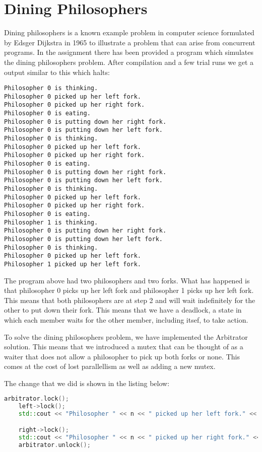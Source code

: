 \section{Dining Philosophers}

Dining philosophers is a known example problem in computer science formulated
by Edsger Dijkstra in 1965 to illustrate a problem that can arise from concurrent
programs. In the assignment there has been provided a program which simulates
the dining philosophers problem. After compilation and a few trial runs we get
a output similar to this which halts:

\begin{lstlisting}[caption=Output from the dining philosophers program.]
Philosopher 0 is thinking.
Philosopher 0 picked up her left fork.
Philosopher 0 picked up her right fork.
Philosopher 0 is eating.
Philosopher 0 is putting down her right fork.
Philosopher 0 is putting down her left fork.
Philosopher 0 is thinking.
Philosopher 0 picked up her left fork.
Philosopher 0 picked up her right fork.
Philosopher 0 is eating.
Philosopher 0 is putting down her right fork.
Philosopher 0 is putting down her left fork.
Philosopher 0 is thinking.
Philosopher 0 picked up her left fork.
Philosopher 0 picked up her right fork.
Philosopher 0 is eating.
Philosopher 1 is thinking.
Philosopher 0 is putting down her right fork.
Philosopher 0 is putting down her left fork.
Philosopher 0 is thinking.
Philosopher 0 picked up her left fork.
Philosopher 1 picked up her left fork.
\end{lstlisting}

The program above had two philosophers and two forks. What has happened is that 
philosopher 0 picks up her left fork and philosopher 1 picks up her left fork.
This means that both philosophers are at step 2 and will wait indefinitely for
the other to put down their fork. This means that we have a deadlock, a state in 
which each member waits for the other member, including itsef, to take action.

To solve the dining philosophers problem, we have implemented the Arbitrator 
solution. This means that we introduced a mutex that can be thought of as a 
waiter that does not allow a philosopher to pick up both forks or none. This 
comes at the cost of lost parallellism as well as adding a new mutex.

The change that we did is shown in the listing below:

\begin{lstlisting}[language=C++, caption=Arbitrator/Waiter code modification]
    arbitrator.lock();
    left->lock();
    std::cout << "Philosopher " << n << " picked up her left fork." << std::endl;

    right->lock();
    std::cout << "Philosopher " << n << " picked up her right fork." << std::endl;
    arbitrator.unlock();
\end{lstlisting}